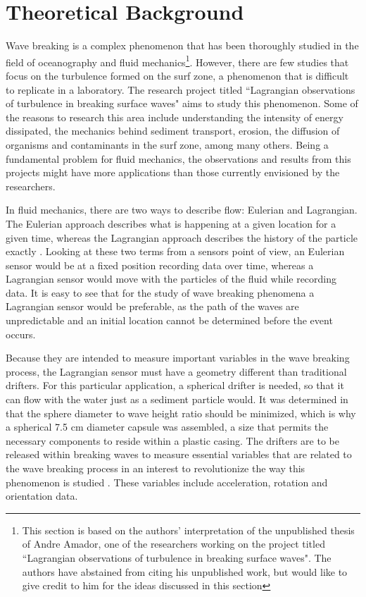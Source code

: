 \section{Theoretical Background}

Wave breaking is a complex phenomenon that has been thoroughly studied in the field of oceanography and fluid mechanics\footnote{This section is based on the authors' interpretation of the unpublished thesis of Andre Amador, one of the researchers working on the project titled ``Lagrangian observations of turbulence in breaking
surface waves".  The authors have abstained from citing his unpublished work, but would like to give credit to him for the ideas discussed in this section}.  However, there are few studies that focus on the turbulence formed on the surf zone, a phenomenon that is difficult to replicate in a laboratory.  The research project titled ``Lagrangian observations of turbulence in breaking
surface waves" aims to study this phenomenon.  Some of the reasons to research this area include understanding the intensity of energy dissipated, the mechanics behind sediment transport, erosion, the diffusion of organisms and contaminants in the surf zone, among many others.  Being a fundamental problem for fluid mechanics, the observations and results from this projects might have more applications than those currently envisioned by the researchers.

In fluid mechanics, there are two ways to describe flow: Eulerian and Lagrangian.  The Eulerian approach describes what is happening at a given location for a given time, whereas the Lagrangian approach describes the history of the particle exactly \cite{Granger1985}.  Looking at these two terms from a sensors point of view, an Eulerian sensor would be at a fixed position recording data over time, whereas a Lagrangian sensor would move with the particles of the fluid while recording data.  It is easy to see that for the study of wave breaking phenomena a Lagrangian sensor would be preferable, as the path of the waves are unpredictable and an initial location cannot be determined before the event occurs.

Because they are intended to measure important variables in the wave breaking process, the Lagrangian sensor must have a geometry different than traditional drifters.  For this particular application, a spherical drifter is needed, so that it can flow with the water just as a sediment particle would.  It was determined in \cite{Canals2012} that the sphere diameter to wave height ratio should be minimized, which is why a spherical 7.5 cm diameter capsule was assembled, a size that permits the necessary components to reside within a plastic casing. The drifters are to be released within breaking waves to measure essential variables that are related to the wave breaking process in an interest to revolutionize the way this phenomenon is studied \cite{Canals2012}.  These variables include acceleration, rotation and orientation data.


